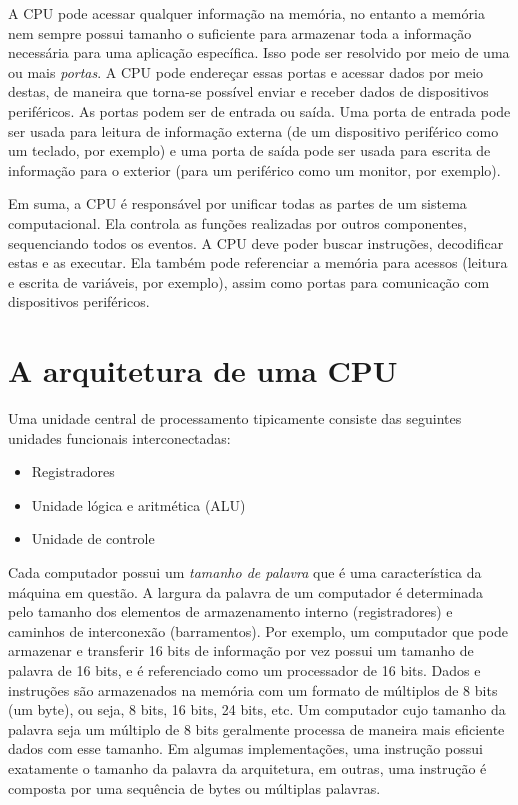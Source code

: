 \documentclass[11pt,a4paper]{report}
\begin{document}
A CPU pode acessar qualquer informação na memória, no entanto a memória
nem sempre possui tamanho o suficiente para armazenar toda a informação
necessária para uma aplicação específica. Isso pode ser resolvido por
meio de uma ou mais \textit{portas}. A CPU pode endereçar essas portas
e acessar dados por meio destas, de maneira que torna-se possível enviar
e receber dados de dispositivos periféricos. As portas podem ser de
entrada ou saída. Uma porta de entrada pode ser usada para leitura de
informação externa (de um dispositivo periférico como um teclado, por
exemplo) e uma porta de saída pode ser usada para escrita de informação
para o exterior (para um periférico como um monitor, por exemplo).

Em suma, a CPU é responsável por unificar todas as partes de um sistema
computacional. Ela controla as funções realizadas por outros componentes,
sequenciando todos os eventos. A CPU deve poder buscar instruções,
decodificar estas e as executar. Ela também pode referenciar a memória
para acessos (leitura e escrita de variáveis, por exemplo), assim como
portas para comunicação com dispositivos periféricos.

\section{A arquitetura de uma CPU}

Uma unidade central de processamento tipicamente consiste das seguintes
unidades funcionais interconectadas:

\begin{itemize}
\item Registradores
\item Unidade lógica e aritmética (ALU)
\item Unidade de controle
\end{itemize}

Cada computador possui um \textit{tamanho de palavra} que é uma
característica da máquina em questão. A largura da palavra de um
computador é determinada pelo tamanho dos elementos de armazenamento
interno (registradores) e caminhos de interconexão (barramentos).
Por exemplo, um computador que pode armazenar e transferir 16 bits de
informação por vez possui um tamanho de palavra de 16 bits, e é 
referenciado como um processador de 16 bits. Dados e instruções são
armazenados na memória com um formato de múltiplos de 8 bits (um byte),
ou seja, 8 bits, 16 bits, 24 bits, etc. Um computador cujo tamanho da
palavra seja um múltiplo de 8 bits geralmente processa de maneira mais
eficiente dados com esse tamanho. Em algumas implementações, uma
instrução possui exatamente o tamanho da palavra da arquitetura, em
outras, uma instrução é composta por uma sequência de bytes ou múltiplas
palavras.
\end{document}
